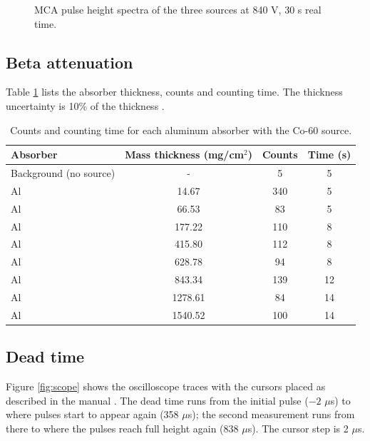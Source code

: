 \documentclass[12pt]{article}
\begin{document}
\begin{figure}[!htbp]
\centering
{}
\caption{MCA pulse height spectra of the three sources at 840 V, 30 s real time.}
\label{fig:mca}
\end{figure}

\subsection{Beta attenuation}

Table \ref{tab:rawbeta} lists the absorber thickness, counts and counting time. The thickness uncertainty is 10\% of the thickness \cite{labmanual}.

\begin{table}[!htbp]
\centering\small
\begin{tabular}{lccc}
\toprule
\textbf{Absorber} & \textbf{Mass thickness (mg/cm$^2$)} & \textbf{Counts} & \textbf{Time (s)} \\
\midrule
Background (no source) & - & \multicolumn{1}{c}{5} & 5 \\
Al & 14.67 & 340 & 5 \\
Al & 66.53 & 83 & 5 \\
Al & 177.22 & 110 & 8 \\
Al & 415.80 & 112 & 8 \\
Al & 628.78 & 94 & 8 \\
Al & 843.34 & 139 & 12 \\
Al & 1278.61 & 84 & 14 \\
Al & 1540.52 & 100 & 14 \\
\bottomrule
\end{tabular}
\caption{Counts and counting time for each aluminum absorber with the Co-60 source.}
\label{tab:rawbeta}
\end{table}

\subsection{Dead time}

Figure \ref{fig:scope} shows the oscilloscope traces with the cursors placed as described in the manual \cite{labmanual}. The dead time runs from the initial pulse ($-2$ $\mu$s) to where pulses start to appear again (358 $\mu$s); the second measurement runs from there to where the pulses reach full height again (838 $\mu$s). The cursor step is 2 $\mu$s.
\end{document}
